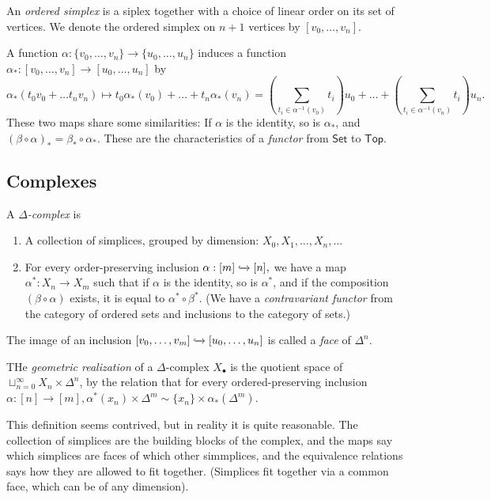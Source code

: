 \begin{definition}
An \emph{ordered simplex} is a siplex together with a choice of linear order on its set of vertices. We denote the ordered simplex on $n+1$ vertices by $[v_0, \ldots, v_n]$. 
\end{definition}
\begin{remark}
A function $\alpha: \{v_0, \ldots, v_n\} \to \{u_0, \ldots, u_n\}$ induces a function $\alpha_*: [v_0, \ldots, v_n] \to [u_0, \ldots, u_n]$ by 
\[
\alpha_*(t_0 v_0 + \ldots t_nv_n) \mapsto t_0 \alpha_*(v_0) + \ldots + t_n \alpha_*(v_n) = \left(\sum_{t_i \in \alpha^{-1}(v_0)}t_i\right)u_0  + \ldots + \left(\sum_{t_i \in \alpha^{-1}(v_n)}t_i\right)u_n. 
\]
These two maps share some similarities: If $\alpha$ is the identity, so is $\alpha_*$, and $(\beta \circ \alpha)_* = \beta_* \circ \alpha_*$. These are the characteristics of a \emph{functor} from $\mathsf{Set}$ to $\mathsf{Top}$.  
\end{remark}
\subsection{Complexes}
\begin{definition}
A \emph{$\Delta$-complex} is
\begin{enumerate}
    \item A collection of simplices, grouped by dimension: 
    $
    X_0, X_1, \ldots, X_n, \ldots
    $
    \item For every order-preserving inclusion 
    $
    \alpha: [m] \xhookrightarrow{} [n], 
    $
    we have a map
    $
    \alpha^*: X_n \to X_m
    $
    such that if $\alpha$ is the identity, so is $\alpha^*$, and if the composition $(\beta \circ \alpha)$ exists, it is equal to $\alpha^* \circ \beta^*$. (We have a \emph{contravariant functor} from the category of ordered sets and inclusions to the category of sets.)
\end{enumerate}
\end{definition}

\begin{definition}
The image of an inclusion $[v_0, \ldots, v_m] \xhookrightarrow{} [u_0, \ldots, u_n]$ is called a \emph{face} of $\Delta^n$. 
\end{definition}


\begin{definition}
THe \emph{geometric realization} of a $\Delta$-complex $X_\bullet$ is the quotient space of $\sqcup_{n = 0}^\infty X_n \times \Delta^n$, by the relation that for every ordered-preserving inclusion $\alpha: [n] \to [m], \alpha^*(x_n) \times \Delta^m \sim \{x_n\} \times \alpha_*(\Delta^m)$. 
\end{definition}
\begin{remark}
This definition seems contrived, but in reality it is quite reasonable. The collection of simplices are the building blocks of the complex, and the maps say which simplices are faces of which other simmplices, and the equivalence relations says how they are allowed to fit together. (Simplices fit together via a common face, which can be of any dimension).
\end{remark}

